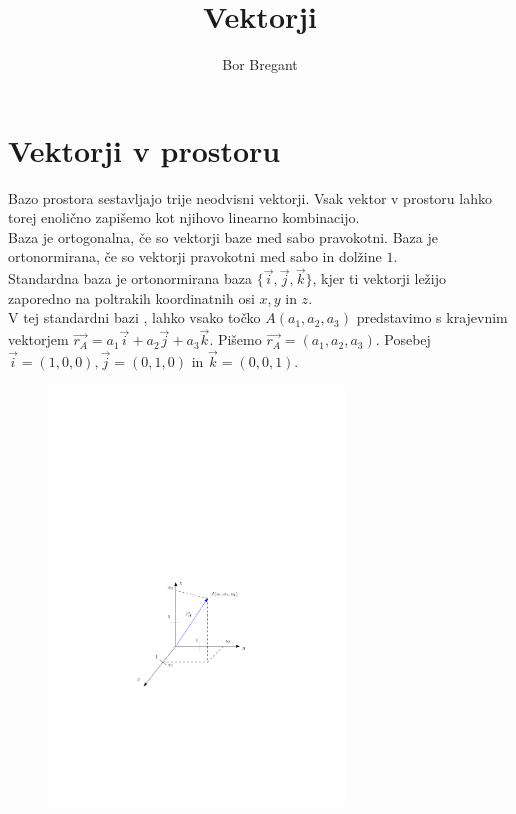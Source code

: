 \documentclass{article}
\title{Vektorji}
\author{Bor Bregant}
\date{\vspace{-5ex}}
\begin{document}
\maketitle

\section{Vektorji v prostoru}

Bazo prostora sestavljajo trije neodvisni vektorji. Vsak vektor v prostoru lahko torej enolično zapišemo kot njihovo linearno kombinacijo.\\
Baza je ortogonalna, če so vektorji baze med sabo pravokotni. Baza je ortonormirana, če so vektorji pravokotni med sabo in dolžine $1$.\\
Standardna baza je ortonormirana baza $\{\vec{i},\vec{j},\vec{k}\}$, kjer ti vektorji ležijo zaporedno na poltrakih koordinatnih osi $x,y$ in $z$.\\
V tej standardni bazi , lahko vsako točko $A(a_1,a_2,a_3)$ predstavimo s krajevnim vektorjem $\vec{r_A}=a_1 \vec{i}+a_2\vec{j}+a_3\vec{k}$. Pišemo $\vec{r_A}=(a_1,a_2,a_3)$. Posebej $\vec{i}=(1,0,0) , \vec{j}=(0,1,0)$ in $\vec{k}=(0,0,1)$.

\begin{figure}[H]
\includegraphics[width=0.7\textwidth]{vektorji.pdf}
\centering
\end{figure}
\end{document}
